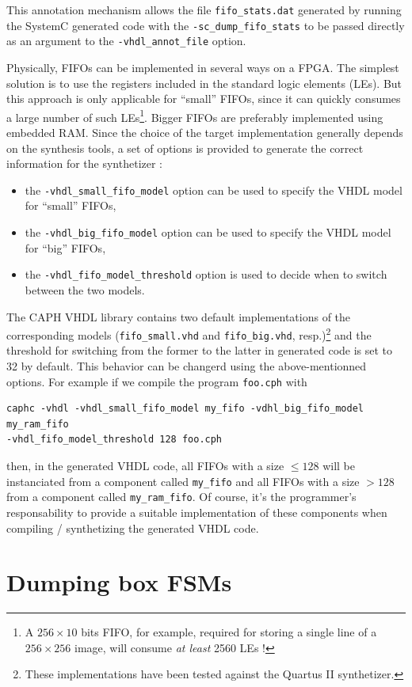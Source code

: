 This annotation mechanism allows the file \verb|fifo_stats.dat| generated by running the SystemC generated code with the
\verb|-sc_dump_fifo_stats| to be passed directly as an argument to the \verb|-vhdl_annot_file|
option. 

\medskip
Physically, FIFOs can be implemented in several ways on a FPGA. The simplest solution is to
use the registers included in the standard logic elements (LEs). But this approach is only
applicable for ``small'' FIFOs, since it can quickly consumes a large number of such LEs\footnote{A
  $256 \times 10$ bits FIFO, for example, required for storing a single line of a $256 \times 256$
  image, will consume \emph{at least} 2560 LEs !}. Bigger FIFOs are preferably implemented using embedded RAM. 
Since the choice of the target implementation generally depends on the synthesis tools, a set of
options is provided to generate the correct information for the synthetizer :
\begin{itemize}
\item the \verb|-vhdl_small_fifo_model| option can be used to specify the VHDL model for ``small'' FIFOs,
\item the \verb|-vhdl_big_fifo_model| option can be used to specify the VHDL model for ``big'' FIFOs,
\item the \verb|-vhdl_fifo_model_threshold| option is used to decide when to switch between the two
  models. 
\end{itemize}
The CAPH VHDL library contains two default implementations of the corresponding models
(\verb|fifo_small.vhd| and \verb|fifo_big.vhd|, resp.)\footnote{These implementations have been tested
against the Quartus II synthetizer.} and the threshold for switching from the former to the latter
in generated code is set to 32 by default. This behavior can be changerd using the above-mentionned
options. For example if we compile the program \texttt{foo.cph} with 
\begin{verbatim}
caphc -vhdl -vhdl_small_fifo_model my_fifo -vdhl_big_fifo_model my_ram_fifo
-vhdl_fifo_model_threshold 128 foo.cph
\end{verbatim}
then, in the generated VHDL code, all FIFOs with a size $\leq 128$ will be instanciated from a
component called \verb|my_fifo| and all FIFOs with a size $>128$ from a component called
\verb|my_ram_fifo|. Of course, it's the programmer's responsability to provide a suitable
implementation of these components when compiling / synthetizing the generated VHDL
code.

\section{Dumping box FSMs}
\label{sec:dumping-box-fsm}


